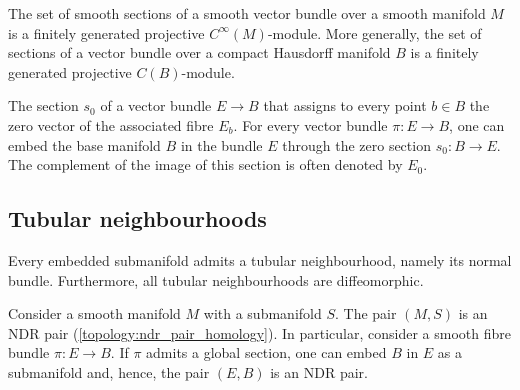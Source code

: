     \begin{theorem}\label{bundle:serre_swan}
        The set of smooth sections of a smooth vector bundle over a smooth manifold $M$ is a finitely generated projective $C^\infty(M)$-module. More generally, the set of sections of a vector bundle over a compact Hausdorff manifold $B$ is a finitely generated projective $C(B)$-module.
    \end{theorem}

    \begin{definition}\label{bundle:zero_section}
        The section $s_0$ of a vector bundle $E\rightarrow B$ that assigns to every point $b\in B$ the zero vector of the associated fibre $E_b$. For every vector bundle $\pi:E\rightarrow B$, one can embed the base manifold $B$ in the bundle $E$ through the zero section $s_0:B\rightarrow E$. The complement of the image of this section is often denoted by $E_0$.
    \end{definition}

\subsection{Tubular neighbourhoods}

    \begin{theorem}\label{bundle:tubular_neighbourhood_theorem}
        Every embedded submanifold admits a tubular neighbourhood, namely its normal bundle. Furthermore, all tubular neighbourhoods are diffeomorphic.
    \end{theorem}
    \begin{result}\label{bundle:ndr_submanifold}
        Consider a smooth manifold $M$ with a submanifold $S$. The pair $(M,S)$ is an NDR pair (\cref{topology:ndr_pair_homology}). In particular, consider a smooth fibre bundle $\pi:E\rightarrow B$. If $\pi$ admits a global section, one can embed $B$ in $E$ as a submanifold and, hence, the pair $(E,B)$ is an NDR pair.
    \end{result}


